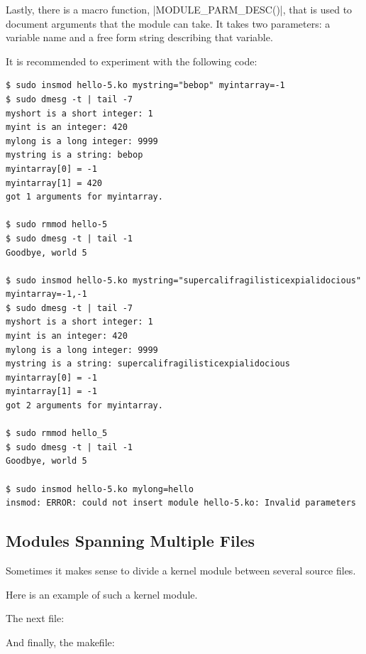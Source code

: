 \documentclass[10pt, oneside]{book}
\begin{document}
Lastly, there is a macro function, \cpp|MODULE_PARM_DESC()|, that is used to document arguments that the module can take.
It takes two parameters: a variable name and a free form string describing that variable.


It is recommended to experiment with the following code:
\begin{verbatim}
$ sudo insmod hello-5.ko mystring="bebop" myintarray=-1
$ sudo dmesg -t | tail -7
myshort is a short integer: 1
myint is an integer: 420
mylong is a long integer: 9999
mystring is a string: bebop
myintarray[0] = -1
myintarray[1] = 420
got 1 arguments for myintarray.

$ sudo rmmod hello-5
$ sudo dmesg -t | tail -1
Goodbye, world 5

$ sudo insmod hello-5.ko mystring="supercalifragilisticexpialidocious" myintarray=-1,-1
$ sudo dmesg -t | tail -7
myshort is a short integer: 1
myint is an integer: 420
mylong is a long integer: 9999
mystring is a string: supercalifragilisticexpialidocious
myintarray[0] = -1
myintarray[1] = -1
got 2 arguments for myintarray.

$ sudo rmmod hello_5
$ sudo dmesg -t | tail -1
Goodbye, world 5

$ sudo insmod hello-5.ko mylong=hello
insmod: ERROR: could not insert module hello-5.ko: Invalid parameters
\end{verbatim}

\subsection{Modules Spanning Multiple Files}
\label{sec:modfiles}
Sometimes it makes sense to divide a kernel module between several source files.

Here is an example of such a kernel module.

The next file:

And finally, the makefile:

\end{document}
